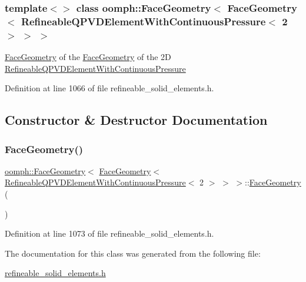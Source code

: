 \subsubsection*{template$<$$>$\newline
class oomph\+::\+Face\+Geometry$<$ Face\+Geometry$<$ Refineable\+Q\+P\+V\+D\+Element\+With\+Continuous\+Pressure$<$ 2 $>$ $>$ $>$}

\hyperlink{classoomph_1_1FaceGeometry}{Face\+Geometry} of the \hyperlink{classoomph_1_1FaceGeometry}{Face\+Geometry} of the 2D \hyperlink{classoomph_1_1RefineableQPVDElementWithContinuousPressure}{Refineable\+Q\+P\+V\+D\+Element\+With\+Continuous\+Pressure} 

Definition at line 1066 of file refineable\+\_\+solid\+\_\+elements.\+h.



\subsection{Constructor \& Destructor Documentation}
\mbox{\label{classoomph_1_1FaceGeometry_3_01FaceGeometry_3_01RefineableQPVDElementWithContinuousPressure_3_012_01_4_01_4_01_4_a0b513bcd160343b52ce7daf71c87287b}} 
\subsubsection{\texorpdfstring{Face\+Geometry()}{FaceGeometry()}}
{\footnotesize\ttfamily \hyperlink{classoomph_1_1FaceGeometry}{oomph\+::\+Face\+Geometry}$<$ \hyperlink{classoomph_1_1FaceGeometry}{Face\+Geometry}$<$ \hyperlink{classoomph_1_1RefineableQPVDElementWithContinuousPressure}{Refineable\+Q\+P\+V\+D\+Element\+With\+Continuous\+Pressure}$<$ 2 $>$ $>$ $>$\+::\hyperlink{classoomph_1_1FaceGeometry}{Face\+Geometry} (\begin{DoxyParamCaption}{ }\end{DoxyParamCaption})\hspace{0.3cm}{\ttfamily [inline]}}



Definition at line 1073 of file refineable\+\_\+solid\+\_\+elements.\+h.



The documentation for this class was generated from the following file\+:\begin{DoxyCompactItemize}
\item 
\hyperlink{refineable__solid__elements_8h}{refineable\+\_\+solid\+\_\+elements.\+h}\end{DoxyCompactItemize}
